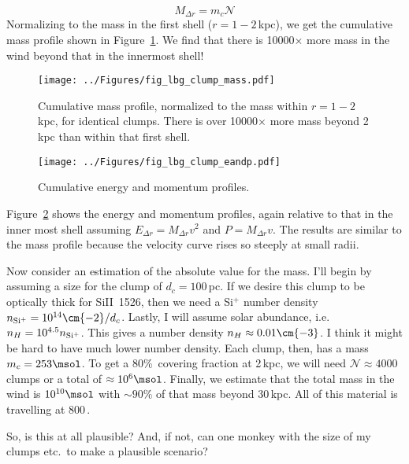 \documentclass[12pt,letterpaper]{article}
\newcommand{\mnc}{\mathcal{N}}
\begin{document}
\begin{equation}
M_{\Delta r} = m_c \mnc 
\end{equation}
Normalizing to the mass in the first shell ($r = 1 - 2$\,kpc), we get
the cumulative mass profile shown in Figure~\ref{fig:mass}.
We find that there is 10000$\times$ more mass in the wind beyond that
in the innermost shell!  

\clearpage

\begin{figure}[ht]
\begin{center}
\texttt{[image: ../Figures/fig\_lbg\_clump\_mass.pdf]}
\end{center}
  \caption{Cumulative mass profile, normalized to the mass within
    $r=1-2$\,kpc, for identical clumps.  There is over 10000$\times$
    more mass beyond 2\,kpc than within that first shell. 
}
  \label{fig:mass}
\end{figure}

\begin{figure}[ht]
\begin{center}
\texttt{[image: ../Figures/fig\_lbg\_clump\_eandp.pdf]}
\end{center}
  \caption{Cumulative energy and momentum profiles.
}
  \label{fig:eandp}
\end{figure}


Figure~\ref{fig:eandp} shows the energy and momentum
profiles, again relative to that in the inner most shell assuming
$E_{\Delta r} = M_{\Delta r} v^2$ and $P = M_{\Delta r} v$.  The
results are similar to the mass profile because the velocity curve
rises so steeply at small radii.

\vskip 0.2in

Now consider an estimation of the absolute value for the mass.  I'll
begin by assuming a size for the clump of $d_c = 100$\,pc.  If we
desire this clump to be optically thick for SiII~1526, then we need a
Si$^+$ number density $n_{\rm Si^+} = 10^{14} \cm{-2} / d_c$.  Lastly,
I will assume solar abundance, i.e. $n_H = 10^{4.5} n_{\rm Si^+}$.
This gives a number density $n_H \approx 0.01 \cm{-3}$.  I think it
might be hard to have much lower number density. Each clump,
then, has a mass $m_c = 253 \msol$. To
get a 80\%\ covering fraction at 2\,kpc, we will need $\mnc \approx
4000$ clumps or a total of $\approx 10^6 \msol$.  Finally, we estimate
that the total mass in the wind is $10^{10} \msol$ with $\sim 90\%$ of
that mass beyond 30\,kpc.  All of this material is travelling at
800\,\kms.  

\vskip 0.1in

So, is this at all plausible?  And, if not, can one monkey with the
size of my clumps etc.\ to make a plausible scenario?
\end{document}
